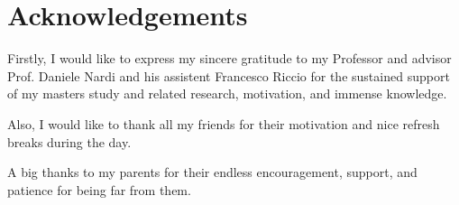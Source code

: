 
\pagestyle{fancy}
\chapter*{Acknowledgements}

Firstly, I would like to express my sincere gratitude to my Professor and advisor Prof. Daniele Nardi and his assistent Francesco Riccio for the sustained support of my masters study and related research, motivation, and immense knowledge. 

\vspace{5pt}
Also, I would like to thank all my friends for their motivation and nice refresh breaks during the day. 

\vspace{5pt}
A big thanks to my parents for their endless encouragement, support, and patience for being far from them.

\clearpage{\pagestyle{empty}\cleardoublepage}